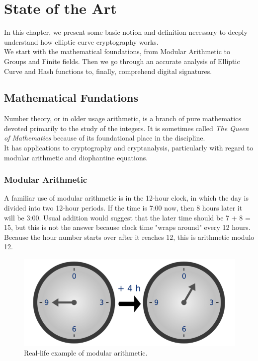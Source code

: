 \chapter{State of the Art}
\label{capitolo2}


In this chapter, we present some basic notion and definition necessary to deeply understand how elliptic curve cryptography works.\\
We start with the mathematical foundations, from Modular Arithmetic to Groups and Finite fields. Then we go through an accurate analysis of Elliptic Curve and Hash functions to, finally, comprehend digital signatures.

\section{Mathematical Fundations}
Number theory, or in older usage arithmetic, is a branch of pure mathematics devoted primarily to the study of the integers. It is sometimes called \textit{The Queen of Mathematics} because of its foundational place in the discipline.\\
It has applications to cryptography and cryptanalysis, particularly with regard to modular arithmetic and diophantine equations.
\subsection{Modular Arithmetic}
A familiar use of modular arithmetic is in the 12-hour clock, in which the day is divided into two 12-hour periods. If the time is 7:00 now, then 8 hours later it will be 3:00. Usual addition would suggest that the later time should be 7 + 8 = 15, but this is not the answer because clock time "wraps around" every 12 hours. Because the hour number starts over after it reaches 12, this is arithmetic modulo 12. 
\begin{figure}[H]
	\centering
	\includegraphics[width=.75\textwidth]{clock.png}
	\caption{Real-life example of modular arithmetic\cite{wiki}.}
	\label{img:clock}
\end{figure}


